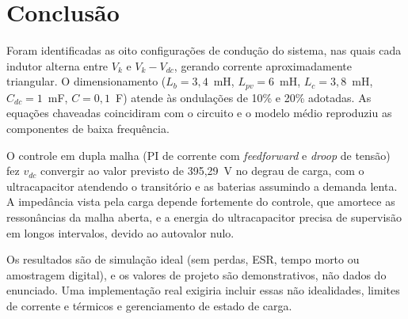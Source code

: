 \section{Conclusão}

Foram identificadas as oito configurações de condução do sistema, nas quais cada indutor alterna entre $V_k$ e $V_k-V_{dc}$, gerando corrente aproximadamente triangular. O dimensionamento ($L_b=3{,}4$~mH, $L_{pv}=6$~mH, $L_c=3{,}8$~mH, $C_{dc}=1$~mF, $C=0{,}1$~F) atende às ondulações de 10\% e 20\% adotadas. As equações chaveadas coincidiram com o circuito e o modelo médio reproduziu as componentes de baixa frequência.

O controle em dupla malha (PI de corrente com \textit{feedforward} e \textit{droop} de tensão) fez $v_{dc}$ convergir ao valor previsto de 395,29~V no degrau de carga, com o ultracapacitor atendendo o transitório e as baterias assumindo a demanda lenta. A impedância vista pela carga depende fortemente do controle, que amortece as ressonâncias da malha aberta, e a energia do ultracapacitor precisa de supervisão em longos intervalos, devido ao autovalor nulo.

Os resultados são de simulação ideal (sem perdas, ESR, tempo morto ou amostragem digital), e os valores de projeto são demonstrativos, não dados do enunciado. Uma implementação real exigiria incluir essas não idealidades, limites de corrente e térmicos e gerenciamento de estado de carga.